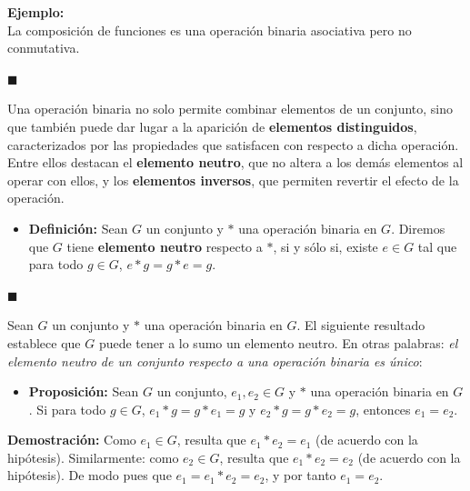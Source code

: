 \documentclass[10 pt]{article}
\begin{document}
\Large{\textbf{Ejemplo:}} \\

\Large{La composición de funciones es una operación binaria asociativa pero no conmutativa.} \\

\begin{flushright}
$\blacksquare$
\end{flushright}

\Large{Una operación binaria no solo permite combinar elementos de un conjunto, sino que también puede dar lugar a la aparición de \textbf{elementos distinguidos}, caracterizados por las propiedades que satisfacen con respecto a dicha operación. Entre ellos destacan el \textbf{elemento neutro}, que no altera a los demás elementos al operar con ellos, y los \textbf{elementos inversos}, que permiten revertir el efecto de la operación.} \\

\begin{itemize}
    \item \Large{\textbf{Definición:} Sean $G$ un conjunto y $*$ una operación binaria en $G$. Diremos que $G$ tiene \textbf{elemento neutro} respecto a $*$, si y sólo si, existe $e \in G$ tal que para todo $g \in G$, $e*g=g*e=g$.} \\
\end{itemize}

\begin{flushright}
    $\blacksquare$
\end{flushright}

\Large{Sean $G$ un conjunto y $*$ una operación binaria en $G$. El siguiente resultado establece que $G$ puede tener a lo sumo un elemento neutro. En otras palabras: \textit{el elemento neutro de un conjunto respecto a una operación binaria es único}:} \\

\begin{itemize}
    \item \Large{\textbf{Proposición:} Sean $G$ un conjunto, $e_1,e_2 \in G$ y $*$ una operación binaria en $G$. Si para todo $g \in G$, $e_1*g=g*e_1=g$ y $e_2*g=g*e_2=g$, entonces $e_1=e_2$.} \\
\end{itemize}

\Large{\textbf{Demostración:} Como $e_1 \in G$, resulta que $e_1*e_2=e_1$ (de acuerdo con la hipótesis). Similarmente: como $e_2 \in G$, resulta que $e_1*e_2=e_2$ (de acuerdo con la hipótesis). De modo pues que $e_1=e_1*e_2=e_2$, y por tanto $e_1=e_2$.} \\
\end{document}
